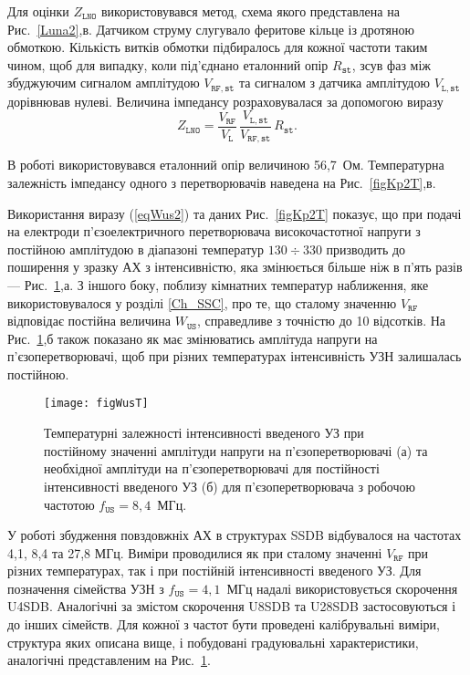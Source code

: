 \documentclass[a4paper,14pt,oneside,openany]{memoir}
\begin{document}
Для оцінки $Z_\mathtt{LNO}$ використовувався метод,
схема якого представлена на Рис.~\ref{Luna2},в.
Датчиком струму слугувало феритове кільце із дротяною обмоткою.
Кількість витків обмотки підбиралось для кожної частоти таким чином, щоб для випадку, коли під'єднано еталонний опір $R_\mathtt{st}$,
зсув фаз між збуджуючим сигналом амплітудою $V_\mathtt{RF,st}$ та сигналом з датчика амплітудою $V_\mathtt{L,st}$
дорівнював нулеві.
Величина імпедансу розраховувалася за допомогою виразу
 \begin{equation}
 \label{eqZlno}
 Z_\mathtt{LNO}=\frac{V_\mathtt{RF}}{V_\mathtt{L}}\,\frac{V_\mathtt{L,st}}{V_\mathtt{RF,st}}\,R_\mathtt{st}.
 \end{equation}

В роботі використовувався еталонний опір величиною 56,7~Ом.
Температурна залежність імпедансу одного з перетворювачів наведена на Рис.~\ref{figKp2T},в.

Використання виразу (\ref{eqWus2}) та даних Рис.~\ref{figKp2T} показує, що при подачі на електроди п'єзоелектричного перетворювача
високочастотної напруги з постійною амплітудою в діапазоні температур $130\div330$ призводить до поширення у зразку АХ з
інтенсивністю, яка змінюється більше ніж в п'ять разів --- Рис.~\ref{figWusT},а.
З іншого боку, поблизу кімнатних температур наближення, яке використовувалося у розділі \ref{Ch_SSC}, про те, що сталому значенню
$V_\mathtt{RF}$ відповідає постійна величина $ W_\mathtt{US}$, справедливе з точністю до 10 відсотків.
На Рис.~\ref{figWusT},б також показано як має змінюватись амплітуда напруги на п'єзоперетворювачі, щоб при різних температурах
інтенсивність УЗН залишалась постійною.


\begin{figure}
\center
\texttt{[image: figWusT]}%
\caption{\label{figWusT}
Температурні залежності
інтенсивності введеного УЗ при постійному значенні амплітуди напруги на п'єзоперетворювачі (а)
та необхідної амплітуди на п'єзоперетворювачі для постійності інтенсивності введеного УЗ (б)
для п'єзоперетворювача з робочою частотою $f_\mathtt{US}=8,4$~МГц.
}
\end{figure}

У роботі збудження повздовжніх АХ в структурах SSDB відбувалося на частотах 4,1, 8,4 та 27,8 МГц.
Виміри проводилися як при сталому значенні $V_\mathtt{RF}$ при різних температурах, так і при постійній інтенсивності введеного УЗ.
Для позначення сімейства УЗН з $f_\mathtt{US}=4,1$~МГц надалі використовується скорочення U4SDB.
Аналогічні за змістом скорочення U8SDB та U28SDB застосовуються і до інших сімейств.
Для кожної з частот бути проведені калібрувальні виміри, структура яких описана вище, і побудовані градуювальні характеристики,
аналогічні представленим на Рис.~\ref{figWusT}.
\end{document}
